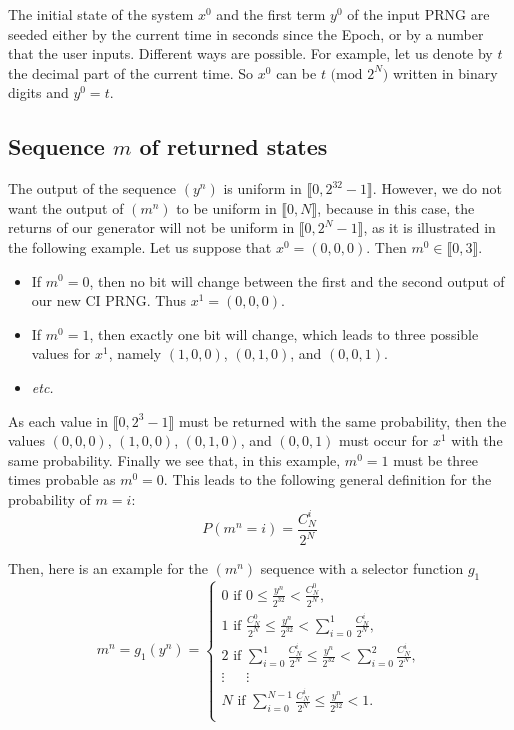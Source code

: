 The initial state of the system $x^0$ and the first term $y^0$ of the input PRNG are seeded either by
the current time in seconds since the Epoch, or by a number that the user inputs.
Different ways are possible. For example, let us denote by $t$ the decimal part of the current
time. So $x^0$ can be $t \text{ (mod $2^N$)}$ written in binary digits and $y^0 = t$.

\subsection{Sequence $m$ of returned states}
\label{algo m}
The output of the sequence $(y^n)$ is uniform in $\llbracket 0, 2^{32}-1 \rrbracket$. However, we do not want the output of $(m^n)$ to be uniform in $\llbracket 0, N \rrbracket$, because in this case, the returns of our generator will not be uniform in $\llbracket 0, 2^{N}-1 \rrbracket$, as it is illustrated in the following example. Let us suppose that $x^0=(0,0,0)$. Then $m^0 \in \llbracket 0, 3 \rrbracket$.
\begin{itemize}
\item If $m^0=0$, then no bit will change between the first and the second output of our new CI PRNG. Thus $x^1 = (0,0,0)$.
\item If $m^0=1$, then exactly one bit will change, which leads to three possible values for $x^1$, namely $(1,0,0)$, $(0,1,0)$, and $(0,0,1)$.
\item \emph{etc.}
\end{itemize}
As each value in $\llbracket 0, 2^3-1 \rrbracket$ must be returned with the same probability, then the values $(0,0,0)$, $(1,0,0)$, $(0,1,0)$, and $(0,0,1)$ must occur for $x^1$ with the same probability. Finally we see that, in this example, $m^0=1$ must be three times probable as $m^0=0$.
This leads to the following general definition for the probability of $m=i$:
\begin{equation}
P(m^n=i)=\frac{C^i_N}{2^N}
\end{equation}

Then, here is an example for the $(m^n)$ sequence with a selector function $g_1$
\begin{equation}
\label{Formula}
m^n = g_1(y^n)=
\left\{
\begin{array}{l}
0 \text{ if }0 \leqslant\frac{y^n}{2^{32}}<\frac{C^0_N}{2^N},\\
1 \text{ if }\frac{C^0_N}{2^N} \leqslant\frac{y^n}{2^{32}}<\sum_{i=0}^1\frac{C^i_N}{2^N},\\
2 \text{ if }\sum_{i=0}^1\frac{C^i_N}{2^N} \leqslant\frac{y^n}{2^{32}}<\sum_{i=0}^2\frac{C^i_N}{2^N},\\
\vdots~~~~~ ~~\vdots~~~ ~~~~\\
N \text{ if }\sum_{i=0}^{N-1}\frac{C^i_N}{2^N} \leqslant\frac{y^n}{2^{32}}<1.\\
\end{array}
\right.
\end{equation}

